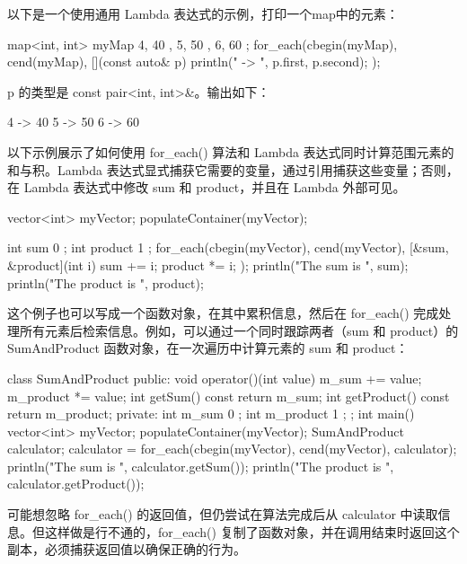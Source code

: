 
以下是一个使用通用 Lambda 表达式的示例，打印一个map中的元素：

\begin{cpp}
map<int, int> myMap { { 4, 40 }, { 5, 50 }, { 6, 60 } };
for_each(cbegin(myMap), cend(myMap), [](const auto& p)
    { println("{} -> {}", p.first, p.second); });
\end{cpp}

p 的类型是 const pair<int, int>\&。输出如下：

\begin{shell}
4 -> 40
5 -> 50
6 -> 60
\end{shell}

以下示例展示了如何使用 for\_each() 算法和 Lambda 表达式同时计算范围元素的和与积。Lambda 表达式显式捕获它需要的变量，通过引用捕获这些变量；否则，在 Lambda 表达式中修改 sum 和 product，并且在 Lambda 外部可见。

\begin{cpp}
vector<int> myVector;
populateContainer(myVector);

int sum { 0 };
int product { 1 };
for_each(cbegin(myVector), cend(myVector),
[&sum, &product](int i){
    sum += i;
    product *= i;
});
println("The sum is {}", sum);
println("The product is {}", product);
\end{cpp}

这个例子也可以写成一个函数对象，在其中累积信息，然后在 for\_each() 完成处理所有元素后检索信息。例如，可以通过一个同时跟踪两者（sum 和 product）的 SumAndProduct 函数对象，在一次遍历中计算元素的 sum 和 product：

\begin{cpp}
class SumAndProduct
{
    public:
        void operator()(int value)
        {
            m_sum += value;
            m_product *= value;
        }
        int getSum() const { return m_sum; }
        int getProduct() const { return m_product; }
    private:
        int m_sum { 0 };
        int m_product { 1 };
};
int main()
{
    vector<int> myVector;
    populateContainer(myVector);
    SumAndProduct calculator;
    calculator = for_each(cbegin(myVector), cend(myVector), calculator);
    println("The sum is {}", calculator.getSum());
    println("The product is {}", calculator.getProduct());
}
\end{cpp}

可能想忽略 for\_each() 的返回值，但仍尝试在算法完成后从 calculator 中读取信息。但这样做是行不通的，for\_each() 复制了函数对象，并在调用结束时返回这个副本，必须捕获返回值以确保正确的行为。

